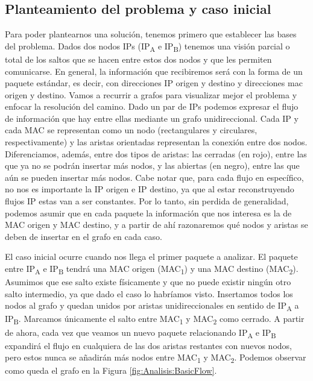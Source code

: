 \documentclass[tfg,epsbased,lof,lot,loa,covers,final,copyright,overleaf]{tfgtfmthesisuam}
\begin{document}
\subsection{Planteamiento del problema y caso inicial}
Para poder plantearnos una solución, tenemos primero que establecer las bases del problema. Dados dos nodos IPs (IP\textsubscript{A} e IP\textsubscript{B}) tenemos una visión parcial o total de los saltos que se hacen entre estos dos nodos y que les permiten comunicarse. En general, la información que recibiremos será con la forma de un paquete estándar, es decir, con direcciones IP origen y destino y direcciones \gls{mac} origen y destino. Vamos a recurrir a grafos para visualizar mejor el problema y enfocar la resolución del camino. Dado un par de IPs podemos expresar el flujo de información que hay entre ellas mediante un grafo unidireccional. Cada IP y cada MAC se representan como un nodo (rectangulares y circulares, respectivamente) y las aristas orientadas representan la conexión entre dos nodos. Diferenciamos, además, entre dos tipos de aristas: las cerradas (en rojo), entre las que ya no se podrán insertar más nodos, y las abiertas (en negro), entre las que aún se pueden insertar más nodos. Cabe notar que, para cada flujo en específico, no nos es importante la IP origen e IP destino, ya que al estar reconstruyendo flujos IP estas van a ser constantes. Por lo tanto, sin perdida de generalidad, podemos asumir que en cada paquete la información que nos interesa es la de MAC origen y MAC destino, y a partir de ahí razonaremos qué nodos y aristas se deben de insertar en el grafo en cada caso. 

El caso inicial ocurre cuando nos llega el primer paquete a analizar. El paquete entre IP\textsubscript{A} e IP\textsubscript{B} tendrá una MAC origen (MAC\textsubscript{1}) y una MAC destino (MAC\textsubscript{2}). Asumimos que ese salto existe físicamente y que no puede existir ningún otro salto intermedio, ya que dado el caso lo habríamos visto. Insertamos todos los nodos al grafo y quedan unidos por aristas unidireccionales en sentido de IP\textsubscript{A} a IP\textsubscript{B}. Marcamos únicamente el salto entre MAC\textsubscript{1} y MAC\textsubscript{2} como cerrado. A partir de ahora, cada vez que veamos un nuevo paquete relacionando IP\textsubscript{A} e IP\textsubscript{B} expandirá el flujo en cualquiera de las dos aristas restantes con nuevos nodos, pero estos nunca se añadirán más nodos entre MAC\textsubscript{1} y MAC\textsubscript{2}. Podemos observar como queda el grafo en la Figura \ref{fig:Analisis:BasicFlow}.
\end{document}
